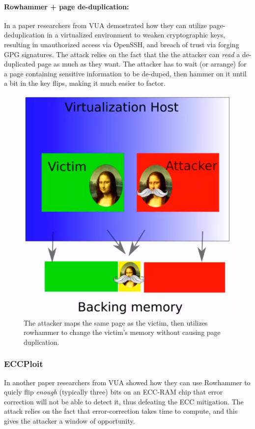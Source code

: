 \paragraph{Rowhammer + page de-duplication:}
In a paper \cite{bib:ffs} researchers from VUA demostrated how they can utilize page-deduplication in a virtualized environment to weaken cryptographic keys, resulting in unauthorized access via OpenSSH, and breach of trust via forging GPG signatures. The attack relies on the fact that the the attacker can \emph{read} a de-duplicated page as much as they want. The attacker has to wait (or arrange) for a page containing sensitive information to be de-duped, then hammer on it until a bit in the key flips, making it much easier to factor.
\begin{figure}[H]
    \centering
	\includegraphics[width=0.5\linewidth]{images/ch9/flip_feng_shui.PNG}
	\caption{The attacker maps the same page as the victim, then utilizes rowhammer to change the victim's memory without causing page duplication.}
	\label{fig:flip_feng_shui}
\end{figure}

\subsubsection{ECCPloit}
In another paper \cite{bib:eccploit} researchers from VUA showed how they can use Rowhammer to quicly flip \emph{enough} (typically three) bits on an ECC-RAM chip that error correction will not be able to detect it, thus defeating the ECC mitigation. The attack relies on the fact that error-correction takes time to compute, and this gives the attacker a window of opportunity.
